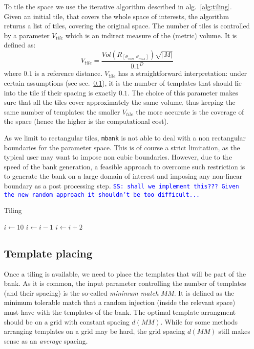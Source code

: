 \documentclass[twocolumn,showpacs,preprintnumbers,nofootinbib,prd,
superscriptaddress,10pt]{revtex4-1}
\newcommand{\stefano}[1]{{\textcolor{blue}{\texttt{SS: #1}} }}
\begin{document}
To tile the space we use the iterative algorithm described in alg.~\ref{alg:tiling}.
Given an initial tile, that covers the whole space of interests, the algorithm returns a list of tiles, covering the original space.
The number of tiles is controlled by a parameter $V_{tile}$ which is an indirect measure of the (metric) volume. It is defined as:
\begin{equation} \label{eq:templates}
	V_{tile} = \frac{Vol(R_{[\theta_{min}, \theta_{max}]}) \sqrt{|M|}}{0.1^D}
\end{equation}
where $0.1$ is a reference distance.
$V_{tile}$ has a straightforward interpretation: under certain assumptions (see sec.~\ref{sec:template_placing}), it is the number of templates that should lie into the tile if their spacing is exactly $0.1$.
The choice of this parameter makes sure that all the tiles cover approximately the same volume, thus keeping the same number of templates: the smaller $V_{tile}$ the more accurate is the coverage of the space (hence the higher is the computational cost).

As we limit to rectangular tiles, \texttt{mbank} is not able to deal with a non rectangular boundaries for the parameter space. This is of course a strict limitation, as the typical user may want to impose non cubic boundaries. However, due to the speed of the bank generation, a feasible approach to overcome such restriction is to generate the bank on a large domain of interest and imposing any non-linear boundary as a post processing step. \stefano{shall we implement this??? Given the new random approach it shouldn't be too difficult...}

\begin{algorithm}[t!]
\caption{Tiling}
\begin{algorithmic}
	\State $i \gets 10$
		\State $i \gets i-1$
	\Else
		    \State $i \gets i+2$
		\EndIf
	\EndIf
\end{algorithmic}
\label{alg:tiling}
\end{algorithm}

\subsection{Template placing} \label{sec:template_placing}

Once a tiling is available, we need to place the templates that will be part of the bank.
As it is common, the input parameter controlling the number of templates (and their spacing) is the so-called {\it minimum match} $MM$. It is defined as the minimum tolerable match that a random injection (inside the relevant space) must have with the templates of the bank.
The optimal template arrangment should be on a grid with constant spacing $d(MM)$. While for some methods arranging templates on a grid may be hard, the grid spacing $d(MM)$ still makes sense as an {\it average} spacing.
\end{document}
